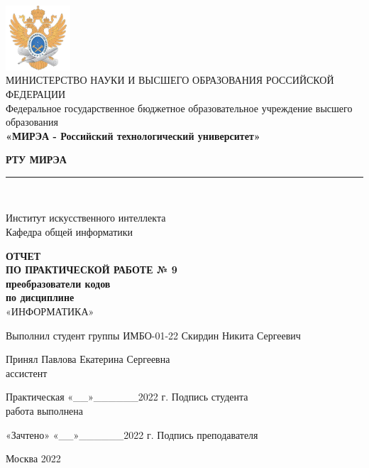 \documentclass[14pt, a4paper]{extreport}
\newcommand{\doublerule}[1][.4pt]{%
	\noindent
	\makebox[0pt][l]{\rule[.6ex]{\linewidth}{#1}}%
	\rule[.3ex]{\linewidth}{#1}
}
\begin{document}
\begin{titlepage}
	\begin{center}
		\vspace*{0.5mm}

		\includegraphics[width=0.18\textwidth]{logo}\\
		\footnotesize
		МИНИСТЕРСТВО НАУКИ И ВЫСШЕГО ОБРАЗОВАНИЯ РОССИЙСКОЙ ФЕДЕРАЦИИ\\
		\small
		Федеральное государственное бюджетное образовательное учреждение высшего образования\\
		\textbf{«МИРЭА - Российский технологический университет»}
		\vspace{0.5cm}

		\large \textbf{РТУ МИРЭА} \normalsize

		\doublerule[1pt]\\
		\vspace{0.4cm}

		Институт искусственного интеллекта\\
		Кафедра общей информатики
		\vspace{1.5cm}

		\textbf{ОТЧЕТ}\\
		\textbf{ПО ПРАКТИЧЕСКОЙ РАБОТЕ № 9}\\
		\textbf{преобразователи кодов}\\
		\textbf{по дисциплине}\\
		«ИНФОРМАТИКА»
		\vspace{1.5cm}

		\small
		Выполнил студент группы ИМБО-01-22 \hfill Скирдин Никита Сергеевич
		\vspace{1cm}

		Принял \hfill Павлова Екатерина Сергеевна\\
		ассистент \hfill
		\vspace{1.5cm}

		\footnotesize
		\hspace{0.5cm} Практическая \hfill «\_\_»\_\_\_\_\_\_2022 г. \hfill Подпись студента\\
		\hspace{0.5cm} работа выполнена \hfill
		\vspace{0.5cm}

		\hspace{2cm} «Зачтено» \hfill «\_\_»\_\_\_\_\_\_2022 г. \hfill Подпись преподавателя
		\vfill

		\small
		Москва 2022
	\end{center}
	\thispagestyle{empty}
\end{titlepage}
\end{document}
